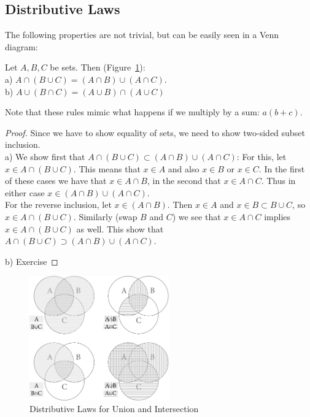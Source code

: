 \subsection{Distributive Laws}

The following properties are not trivial, but can be easily seen in a Venn
diagram:
\begin{thm}
Let $A,B,C$ be sets. Then (Figure~\ref{figvenndist}):\\
a) $A\cap (B\cup C)=(A\cap B)\cup(A\cap C)$.\\
b) $A\cup (B\cap C)=(A\cup B)\cap(A\cup C)$
\end{thm}
Note that these rules mimic what happens if we multiply by a sum: $a(b+c)$.
\begin{proof}
Since we have to show equality of sets, we need to show two-sided subset
inclusion.\\
a) We show first that $A\cap (B\cup C)\subset (A\cap B)\cup(A\cap C)$: For this,
let $x\in A\cap (B\cup C)$. This means that $x\in A$ and also $x\in B$ or
$x\in C$. In the first of these cases we have that $x\in A\cap B$, in the
second that $x\in A\cap C$. Thus in either case $x\in (A\cap B)\cup (A\cap
C)$. \\
For the reverse inclusion,
let $x\in (A\cap B)$. Then $x\in A$ and $x\in B\subset B\cup C$, so $x\in
A\cap (B\cup C)$. Similarly (swap $B$ and $C$) we see that $x\in A\cap C$
implies $x\in A\cap (B\cup C)$ as well. This show that
$A\cap (B\cup C)\supset (A\cap B)\cup(A\cap C)$.

b) Exercise
\end{proof}

\begin{figure}[t]
\begin{center}
\includegraphics[width=6cm]{pic/VennDistributiveLaws.pdf}
\end{center}
\caption{Distributive Laws for Union and Intersection}
\label{figvenndist}
\end{figure}

